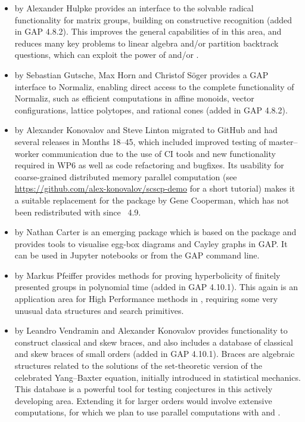 \begin{itemize}
\item
{}  by Alexander Hulpke \cite{matgrp} provides an interface
to the solvable radical functionality for matrix groups, building on
constructive recognition (added in GAP 4.8.2). This improves the
general capabilities of \GAP in this area, and reduces many key
problems to linear algebra and/or partition backtrack questions, which
can exploit the power of  and/or .

\item
{} by Sebastian Gutsche, Max Horn and
Christof S\"oger \cite{NormalizInterface} provides a GAP interface to Normaliz, enabling
direct access to the complete functionality of Normaliz, such as efficient
computations in affine monoids, vector configurations, lattice
polytopes, and rational cones (added in GAP 4.8.2). 

\item
{} by Alexander Konovalov and Steve Linton \cite{SCSCP}
migrated to GitHub and had several releases
in Months 18--45, which included improved testing of 
master--worker communication due to the use of
CI tools and new functionality required in WP6 as well as
code refactoring and bugfixes. Its usability for 
coarse-grained distributed memory parallel computation
(see \url{https://github.com/alex-konovalov/scscp-demo}
for a short tutorial) makes it a suitable replacement for the 
package by Gene Cooperman, which has not been redistributed 
with \GAP since \GAP~4.9.

\item
{} by Nathan Carter \cite{SemigroupViz} is an emerging
package which is based on the  package \cite{JupyterViz}
and provides tools to visualise egg-box diagrams and Cayley graphs in
GAP. It can be used in Jupyter notebooks or from the GAP command line.
%
%

\item
{} by Markus Pfeiffer \cite{walrus} provides methods for proving 
hyperbolicity of finitely presented groups in polynomial time
(added in GAP 4.10.1). This again is an application area for High
Performance methods in \GAP, requiring some very unusual data
structures and search primitives.

\item
{} by Leandro Vendramin and Alexander Konovalov \cite{YangBaxter}
provides functionality to construct classical and 
skew braces, and also includes a database of classical 
and skew braces of small orders (added in GAP 4.10.1). 
Braces are algebraic structures related to the solutions
of the set-theoretic version of the celebrated Yang--Baxter equation,
initially introduced in statistical mechanics.
This database is a powerful tool for testing conjectures
in this actively developing area. Extending it for larger
orders would involve extensive computations, for which we 
plan to use parallel computations with  and \HPCGAP.

\end{itemize}
